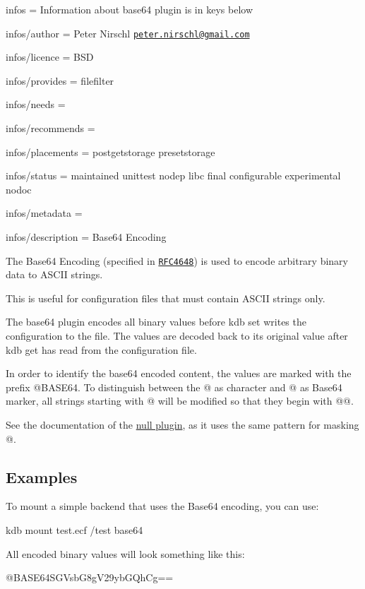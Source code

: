 
\begin{DoxyItemize}
\item infos = Information about base64 plugin is in keys below
\item infos/author = Peter Nirschl \href{mailto:peter.nirschl@gmail.com}{\tt peter.\+nirschl@gmail.\+com}
\item infos/licence = B\+S\+D
\item infos/provides = filefilter
\item infos/needs =
\item infos/recommends =
\item infos/placements = postgetstorage presetstorage
\item infos/status = maintained unittest nodep libc final configurable experimental nodoc
\item infos/metadata =
\item infos/description = Base64 Encoding
\end{DoxyItemize}

The Base64 Encoding (specified in \href{https://www.ietf.org/rfc/rfc4648.txt}{\tt R\+F\+C4648}) is used to encode arbitrary binary data to A\+S\+C\+I\+I strings.

This is useful for configuration files that must contain A\+S\+C\+I\+I strings only.

The {\ttfamily base64} plugin encodes all binary values before {\ttfamily kdb set} writes the configuration to the file. The values are decoded back to its original value after {\ttfamily kdb get} has read from the configuration file.

In order to identify the base64 encoded content, the values are marked with the prefix {\ttfamily @B\+A\+S\+E64}. To distinguish between the {\ttfamily @} as character and {\ttfamily @} as Base64 marker, all strings starting with {\ttfamily @} will be modified so that they begin with {\ttfamily @@}.

See the documentation of the \hyperlink{md_src_plugins_null_README_src_plugins_null_README_md}{null plugin}, as it uses the same pattern for masking {\ttfamily @}.

\subsection*{Examples}

To mount a simple backend that uses the Base64 encoding, you can use\+: \begin{DoxyVerb}kdb mount test.ecf /test base64
\end{DoxyVerb}


All encoded binary values will look something like this\+: \begin{DoxyVerb}@BASE64SGVsbG8gV29ybGQhCg==\end{DoxyVerb}
 